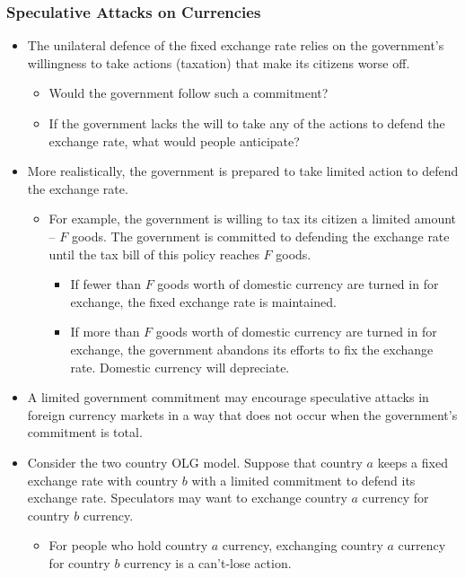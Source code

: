 \documentclass[a4paper,twoside]{article}
\newif\IfInSansMode
\numberwithin{equation}{section}
\numberwithin{figure}{section}
\begin{document}
\subsubsection{Speculative Attacks on Currencies}
	\begin{itemize}
		\item The unilateral defence of the fixed exchange rate relies on the government's willingness to take actions (taxation) that make its citizens worse off.
		\begin{itemize}
			\item Would the government follow such a commitment?
			\item If the government lacks the will to take any of the actions to defend the exchange rate, what would people anticipate?
		\end{itemize}
		\item More realistically, the government is prepared to take limited action to defend the exchange rate.
		\begin{itemize}
			\item For example, the government is willing to tax its citizen a limited amount -- \( F \) goods. The government is committed to defending the exchange rate until the tax bill of this policy reaches \( F \) goods.
			\begin{itemize}
				\item If fewer than \( F \) goods worth of domestic currency are turned in for exchange, the fixed exchange rate is maintained.
				\item If more than \( F \) goods worth of domestic currency are turned in for exchange, the government abandons its efforts to fix the exchange rate. Domestic currency will depreciate.
			\end{itemize}
		\end{itemize}
		\item A limited government commitment may encourage speculative attacks in foreign currency markets in a way that does not occur when the government's commitment is total.
		\item Consider the two country OLG model. Suppose that country \( a \) keeps a fixed exchange rate with country \( b \) with a limited commitment to defend its exchange rate. Speculators may want to exchange country \( a \) currency for country \( b \) currency.
		\begin{itemize}
			\item For people who hold country \( a \) currency, exchanging country \( a \) currency for country \( b \) currency is a can't-lose action.

\end{itemize}
\end{itemize}
\end{document}
